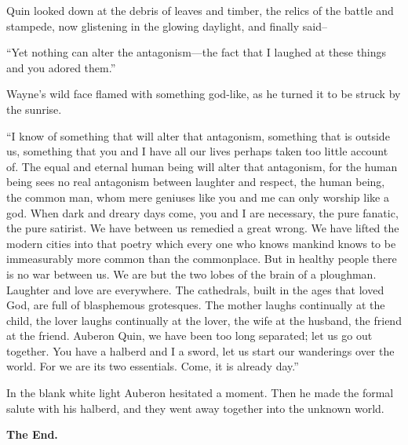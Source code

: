 \documentclass{book}
\newcommand\mdstrong[1]{\textbf{#1}}
\begin{document}
Quin looked down at the debris of leaves and timber, the relics of the battle and stampede, now glistening in the glowing daylight, and finally said–

“Yet nothing can alter the antagonism—the fact that I laughed at these things and you adored them.”

Wayne’s wild face flamed with something god-like, as he turned it to be struck by the sunrise.

“I know of something that will alter that antagonism, something that is outside us, something that you and I have all our lives perhaps taken too little account of. The equal and eternal human being will alter that antagonism, for the human being sees no real antagonism between laughter and respect, the human being, the common man, whom mere geniuses like you and me can only worship like a god. When dark and dreary days come, you and I are necessary, the pure fanatic, the pure satirist. We have between us remedied a great wrong. We have lifted the modern cities into that poetry which every one who knows mankind knows to be immeasurably more common than the commonplace. But in healthy people there is no war between us. We are but the two lobes of the brain of a ploughman. Laughter and love are everywhere. The cathedrals, built in the ages that loved God, are full of blasphemous grotesques. The mother laughs continually at the child, the lover laughs continually at the lover, the wife at the husband, the friend at the friend. Auberon Quin, we have been too long separated; let us go out together. You have a halberd and I a sword, let us start our wanderings over the world. For we are its two essentials. Come, it is already day.”

In the blank white light Auberon hesitated a moment. Then he made the formal salute with his halberd, and they went away together into the unknown world.

\mdstrong{The End.}
\end{document}
